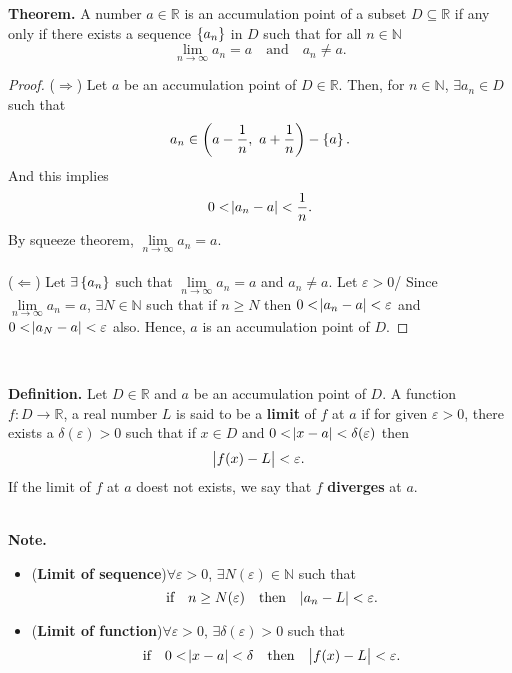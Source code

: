 \documentclass[12pt,a4paper]{article}
\begin{document}
\begin{tcolorbox}[colback=white]
	\textbf{Theorem.} A number $a\in\mathbb{R}$ is an accumulation point of a subset $D\subseteq\mathbb{R}$ if any only if there exists a sequence $\set{a_n}$ in $D$ such that for all $n\in\mathbb{N}$ \[
	\lim\limits_{n\to\infty}a_n=a\quad\text{and}\quad a_n\neq a.
	\]\tcblower\begin{proof}
		($\Rightarrow$) Let $a$ be an accumulation point of $D\in\mathbb{R}$. Then, for $n\in\mathbb{N}$, $\exists a_n\in D$ such that \[
		a_n\in\left(a-\frac{1}{n},\ a+\frac{1}{n} \right)-\set{a}.
		\] And this implies \[
		0<\abs{a_n-a}<\frac{1}{n}.
		\] By squeeze theorem, $\lim\limits_{n\to\infty}a_n=a$.\\
		\\
		($\Leftarrow$) Let $\exists\set{a_n}$ such that $\lim\limits_{n\to\infty}a_n=a$ and $a_n\neq a$. Let $\varepsilon>0$/ Since $\lim\limits_{n\to\infty}a_n=a$, $\exists N\in\mathbb{N}$ such that if $n\geq N$ then $0<\abs{a_n-a}<\varepsilon$ and $0<\abs{a_N-a}<\varepsilon$ also. Hence, $a$ is an accumulation point of $D$.
	\end{proof}
\end{tcolorbox}
\
\begin{tcolorbox}[colback=white]
	\textbf{Definition.} Let $D\in\mathbb{R}$ and $a$ be an accumulation point of $D$. A function $f:D\to\mathbb{R}$, a real number $L$ is said to be a \textbf{limit} of $f$ at $a$ if for given $\varepsilon>0$, there exists a $\delta(\varepsilon)>0$ such that if $x\in D$ and $0<\abs{x-a}<\delta(\varepsilon)$ then \[
	\abs{f(x)-L}<\varepsilon.
	\] If the limit of $f$ at $a$ doest not exists, we say that $f$ \textbf{diverges} at $a$.
\end{tcolorbox}\
\\ \textbf{Note.} \begin{itemize}
	\item (\textbf{Limit of sequence})\quad $\forall\varepsilon>0$, $\exists N(\varepsilon)\in\mathbb{N}$ such that \[
	\text{if}\quad n\geq N(\varepsilon)\quad\text{then}\quad\abs{a_n-L}<\varepsilon.
	\]
	\item (\textbf{Limit of function})\quad $\forall\varepsilon>0$, $\exists \delta(\varepsilon)>0$ such that \[
	\text{if}\quad 0<\abs{x-a}<\delta\quad\text{then}\quad\abs{f(x)-L}<\varepsilon.
	\]
\end{itemize}
\end{document}
